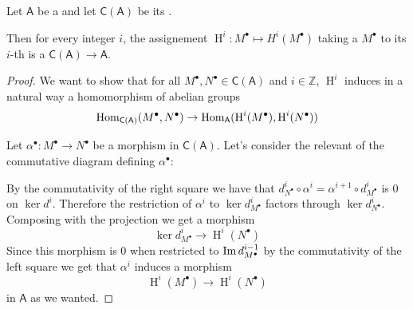 \documentclass[../main.tex]{subfiles}
\begin{document}
\begin{lemma}
  Let \(\mathsf{A}\) be a  and let \(\mathsf{C}(\mathsf{A})\) be its .

  Then for every integer \(i\), the assignement \(\operatorname{H}^{i}: M^{\bullet} \mapsto H^{i}(M^{\bullet})\) taking a  \(M^{\bullet}\) to its \(i\)-th  is a  \(\mathsf{C}(\mathsf{A}) \to \mathsf{A}\).
\end{lemma}
\begin{proof}
  We want to show that for all  \(M^{\bullet}, N^{\bullet} \in \mathsf{C}(\mathsf{A})\) and \(i \in \mathbb{Z}\), \(\operatorname{H}^{i}\) induces in a natural way a homomorphism of abelian groups
  \begin{equation*}
    \operatorname{Hom}_{\mathsf{C}(\mathsf{A})}(M^{\bullet}, N^{\bullet}) \to \operatorname{Hom}_{\mathsf{A}}(\operatorname{H}^{i}(M^{\bullet}), \operatorname{H}^{i}(N^{\bullet}))
  \end{equation*}

  Let \(\alpha^{\bullet}: M^{\bullet} \to N^{\bullet}\) be a morphism in \(\mathsf{C}(\mathsf{A})\). Let's consider the relevant of the commutative diagram defining \(\alpha^{\bullet}\):
  \begin{center}
  \end{center}
  By the commutativity of the right square we have that \(d_{N^{\bullet}}^{i} \circ \alpha^{i} = \alpha^{i+1} \circ d_{M^{\bullet}}^{i}\) is 0 on \(\ker d^{i}\).
  Therefore the restriction of \(\alpha^{i}\) to \(\ker d_{M^{\bullet}}^{i}\) factors through \(\ker d_{N^{\bullet}}^{i}\).
  Composing with the projection we get a morphism
  \begin{equation*}
    \ker d_{M^{\bullet}}^{i} \to \operatorname{H}^{i}(N^{\bullet})
  \end{equation*}
  Since this morphism is 0 when restricted to \(\operatorname*{Im} d_{M^{\bullet}}^{i-1}\) by the commutativity of the left square we get that \(\alpha^{i}\) induces a morphism
  \begin{equation*}
    \operatorname{H}^{i}(M^{\bullet}) \to \operatorname{H}^{i}(N^{\bullet})
  \end{equation*}
  in \(\mathsf{A}\) as we wanted.
\end{proof}
\end{document}
